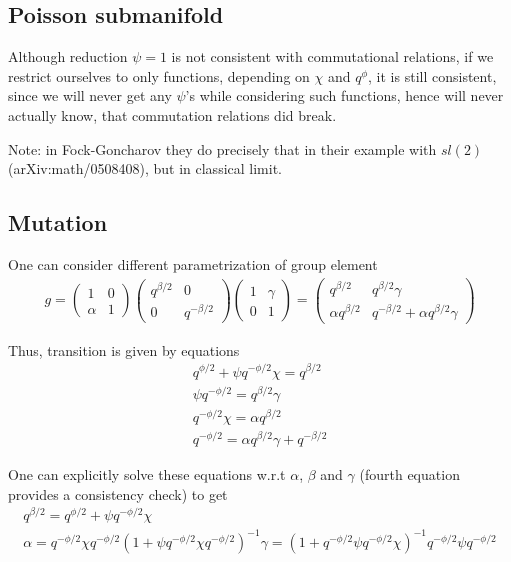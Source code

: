 \documentclass{article}
\newcommand{\lb}{\left (}
\newcommand{\rb}{\right )}
\newcommand{\lsb}{\left [}
\newcommand{\rsb}{\right ]}
\newcommand{\be}{\begin{eqnarray}}
\newcommand{\ee}{\end{eqnarray}}
\newcommand {\?}{\textit{???}}
\newcommand{\matd}[4]{\lb \begin{array}{cc}
#1 & #2 \\ #3 & #4
\end{array} \rb}
\newcommand{\delabel}[1]{(\ref{#1})}
\newcommand{\Eoned}[1]{\lb \begin{array}{cc}
1 & #1 \\ 0 & 1
\end{array} \rb}
\newcommand{\Foned}[1]{\lb \begin{array}{cc}
1 & 0 \\ #1 & 1
\end{array} \rb}
\begin{document}



\subsection{Poisson submanifold}
Although reduction $\psi = 1$ is not consistent with commutational relations, if we
restrict ourselves to only functions, depending on $\chi$ and $q^\phi$, it is still consistent,
since we will never get any $\psi$'s while considering such functions, hence will never actually
know, that commutation relations did break.

Note: in Fock-Goncharov they do precisely that in their example with $sl(2)$ (arXiv:math/0508408),
but in classical limit.

\subsection{Mutation}

One can consider different parametrization of group element
\be
g = \Foned{\alpha} \matd{q^{\beta/2}}{0}{0}{q^{-\beta/2}} \Eoned{\gamma} = \matd{q^{\beta/2} }{q^{\beta/2}\gamma}{\alpha q^{\beta/2}}{q^{-\beta/2} + \alpha q^{\beta/2}\gamma} \label{g_quantd_2}
\ee

Thus, transition is given by equations
\be
q^{\phi/2} + \psi q^{-\phi/2} \chi = q^{\beta/2} \\
\psi q^{-\phi/2} = q^{\beta/2} \gamma \\
q^{-\phi/2} \chi = \alpha q^{\beta/2} \\
q^{-\phi/2} = \alpha q^{\beta/2} \gamma + q^{-\beta/2}
\ee

One can explicitly solve these equations w.r.t $\alpha$, $\beta$ and $\gamma$
(fourth equation provides a consistency check) to get
\be
q^{\beta/2} = q^{\phi/2} + \psi q^{-\phi/2} \chi \\
\alpha = q^{-\phi/2} \chi q^{-\phi/2} \lb 1 + \psi q^{-\phi/2} \chi q^{-\phi/2} \rb^{-1}
\gamma = \lb 1 + q^{-\phi/2} \psi q^{-\phi/2} \chi \rb^{-1} q^{-\phi/2} \psi q^{-\phi/2}
\ee
\end{document}
